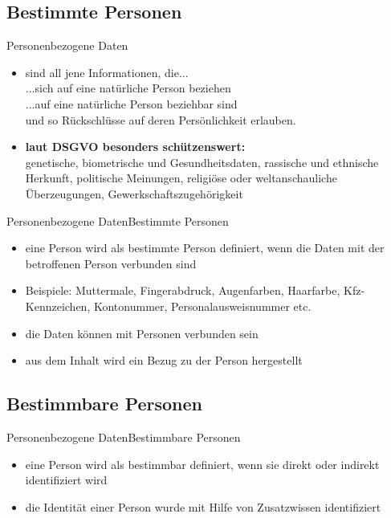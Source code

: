 \documentclass[9pt]{beamer}
\begin{document}
        \subsection{Bestimmte Personen}
            \begin{frame}{Personenbezogene Daten}{}
                \begin{itemize}
        		    \item sind all jene Informationen, die...\\...sich auf eine natürliche Person beziehen\\...auf eine natürliche Person beziehbar sind\\und so Rückschlüsse auf deren Persönlichkeit erlauben.\newline{}
        		    \item \textbf{laut DSGVO besonders schützenswert:}\\genetische, biometrische und Gesundheitsdaten, rassische und ethnische Herkunft, politische Meinungen, religiöse oder weltanschauliche Überzeugungen, Gewerkschaftszugehörigkeit
        	    \end{itemize}
            \end{frame}

            \begin{frame}{Personenbezogene Daten}{Bestimmte Personen}
                \begin{itemize}
            		\item eine Person wird als bestimmte Person definiert, wenn die Daten mit der betroffenen Person verbunden sind
            		\item Beispiele: Muttermale, Fingerabdruck, Augenfarben, Haarfarbe, Kfz-Kennzeichen, Kontonummer, Personalausweisnummer etc.
            		\item die Daten können mit Personen verbunden sein
            		\item aus dem Inhalt wird ein Bezug zu der Person hergestellt
            	\end{itemize}
            \end{frame}


        \subsection{Bestimmbare Personen}
            \begin{frame}{Personenbezogene Daten}{Bestimmbare Personen}
                \begin{itemize}
            		\item eine Person wird als bestimmbar definiert, wenn sie direkt oder indirekt identifiziert wird
            		\item die Identität einer Person wurde mit Hilfe von Zusatzwissen identifiziert
            	\end{itemize}
            \end{frame}
\end{document}
